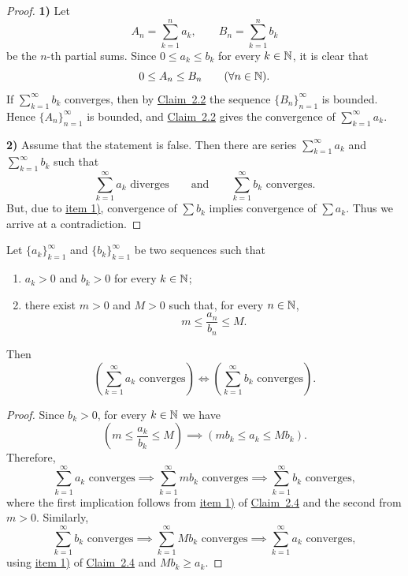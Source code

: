 \begin{proof}
\textbf{1)} Let
\[
A_n=\sum_{k=1}^{n}a_k,
\qquad
B_n=\sum_{k=1}^{n}b_k
\]
be the $n$-th partial sums. Since $0\le a_k\le b_k$ for every $k\in\mathbb{N}$, it is clear that
\[
0\le A_n\le B_n\qquad(\forall n\in\mathbb{N}).
\]
If $\sum_{k=1}^{\infty}b_k$ converges, then by \hyperref[claim:2.2]{Claim~2.2} the sequence $\{B_n\}_{n=1}^{\infty}$ is bounded. Hence $\{A_n\}_{n=1}^{\infty}$ is bounded, and \hyperref[claim:2.2]{Claim~2.2} gives the convergence of $\sum_{k=1}^{\infty}a_k$.

\medskip
\noindent\textbf{2)} Assume that the statement is false. Then there are series $\sum_{k=1}^{\infty}a_k$ and $\sum_{k=1}^{\infty}b_k$ such that
\[
\sum_{k=1}^{\infty}a_k\text{ diverges}
\qquad\text{and}\qquad
\sum_{k=1}^{\infty}b_k\text{ converges}.
\]
But, due to \hyperref[item:claim:2.4:1]{item 1)}, convergence of $\sum b_k$ implies convergence of $\sum a_k$. Thus we arrive at a contradiction.
\end{proof}

\begin{claim}\label{claim:2.5}
Let $\{a_k\}_{k=1}^{\infty}$ and $\{b_k\}_{k=1}^{\infty}$ be two sequences such that
\begin{enumerate}[label=\alph*)]
\item\label{item:claim:2.5:a} $a_k>0$ and $b_k>0$ for every $k\in\mathbb{N}$;
\item\label{item:claim:2.5:b} there exist $m>0$ and $M>0$ such that, for every $n\in\mathbb{N}$,
\[
m\le\frac{a_n}{b_n}\le M.
\]
\end{enumerate}
Then
\[
\left(\sum_{k=1}^{\infty}a_k\text{ converges}\right)
\iff
\left(\sum_{k=1}^{\infty}b_k\text{ converges}\right).
\]
\end{claim}

\begin{proof}
Since $b_k>0$, for every $k\in\mathbb{N}$ we have
\[
\left(m\le\frac{a_k}{b_k}\le M\right)
\implies
\left(mb_k\le a_k\le Mb_k\right).
\]
Therefore,
\[
\sum_{k=1}^{\infty}a_k\text{ converges}
\implies
\sum_{k=1}^{\infty}mb_k\text{ converges}
\implies
\sum_{k=1}^{\infty}b_k\text{ converges},
\]
where the first implication follows from \hyperref[item:claim:2.4:1]{item 1)} of \hyperref[claim:2.4]{Claim~2.4} and the second from $m>0$. Similarly,
\[
\sum_{k=1}^{\infty}b_k\text{ converges}
\implies
\sum_{k=1}^{\infty}Mb_k\text{ converges}
\implies
\sum_{k=1}^{\infty}a_k\text{ converges},
\]
using \hyperref[item:claim:2.4:1]{item 1)} of \hyperref[claim:2.4]{Claim~2.4} and $Mb_k\ge a_k$.
\end{proof}

